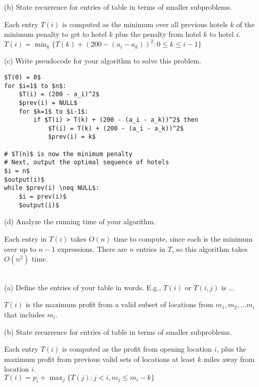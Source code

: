\documentclass[12pt]{amsart}
\theoremstyle{plain}
\theoremstyle{definition}
\theoremstyle{remark}
\begin{document}
	(b) State recurrence for entries of table in terms of smaller subproblems.

	\begin{tcolorbox}
		Each entry $T(i)$ is computed as the minimum over all previous hotels $k$ of the minimum penalty to get to hotel $k$ plus the penalty from hotel $k$ to hotel $i$.\\
		$T(i) = \min_k\{T(k) + (200 - (a_i - a_k))^2 : 0 \leq k \leq i-1\}$
	\end{tcolorbox}

	(c) Write pseudocode for your algorithm to solve this problem.
	
	\begin{tcolorbox}
		\begin{lstlisting}[tabsize=4]
$T(0) = 0$
for $i=1$ to $n$:
	$T(i) = (200 - a_i)^2$
	$prev(i) = NULL$
	for $k=1$ to $i-1$:
		if $T(i) > T(k) + (200 - (a_i - a_k))^2$ then
			$T(i) = T(k) + (200 - (a_i - a_k))^2$
			$prev(i) = k$

# $T(n)$ is now the minimum penalty
# Next, output the optimal sequence of hotels
$i = n$
$output(i)$
while $prev(i) \neq NULL$:
	$i = prev(i)$
	$output(i)$

		\end{lstlisting}
	\end{tcolorbox}

	(d) Analyze the running time of your algorithm.
	
	\begin{tcolorbox}
		Each entry in $T(i)$ takes $O(n)$ time to compute, since each is the minimum over up to $n-1$ expressions.  There are $n$ entries in $T$, so this algorithm takes $O(n^2)$ time.
	\end{tcolorbox}
	
	\newpage
	  \\
	(a) Define the entries of your table in words.  E.g., $T(i)$ or $T(i,j)$ is ...
	
	\begin{tcolorbox}
		$T(i)$ is the maximum profit from a valid subset of locations from $m_1, m_2, ... m_i$ that includes $m_i$.
	\end{tcolorbox}
	
	(b) State recurrence for entries of table in terms of smaller subproblems.
	
	\begin{tcolorbox}
		Each entry $T(i)$ is computed as the profit from opening location $i$, plus the maximum profit from previous valid sets of locations at least $k$ miles away from location $i$.\\
		$T(i) = p_i + \max_j\{T(j) : j < i, m_j \leq m_i - k\}$
	\end{tcolorbox}
	
\end{document}
